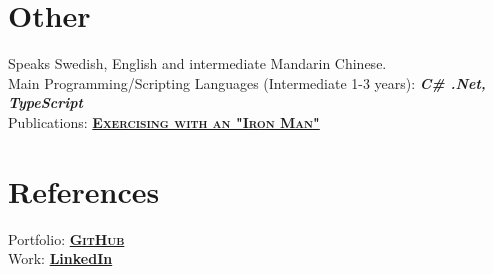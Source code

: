 \documentclass[11pt,a4paper,sans,colorlinks,linkcolor=blue,urlcolor=blue]{moderncv}
\begin{document}
\section{Other}
Speaks Swedish, English and intermediate Mandarin Chinese.
\\
{Main Programming/Scripting Languages (Intermediate 1-3 years): \textbf{\textit{C\# .Net, TypeScript}}}
\\
Publications: \href{https://arxiv.org/abs/1909.12262}{\textbf{\textsc{Exercising with an "Iron Man"}}}

\section{References}
Portfolio: \href{https://github.com/jacobpihl}{\textbf{\textsc{GitHub}}}
\\
Work: \href{https://www.linkedin.com/in/jacob-pihl-3ba72a141/}{\textbf{LinkedIn}}
\end{document}
